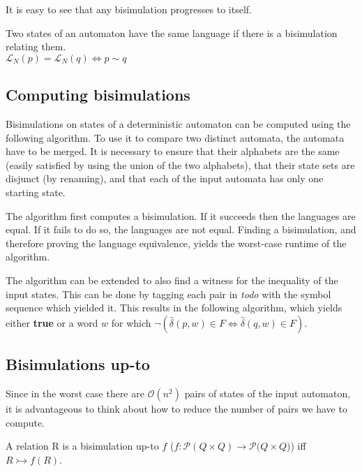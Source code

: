 It is easy to see that any bisimulation progresses to itself.

\begin{definition}
  Two states of an automaton have the same language if there is a bisimulation relating them. \\
  $\mathcal{L}_N(p) = \mathcal{L}_N(q) \iff p \sim q$
\end{definition}

\subsection{Computing bisimulations}

Bisimulations on states of a deterministic automaton can be computed using the following algorithm.
To use it to compare two distinct automata, the automata have to be merged.
It is necessary to ensure that their alphabets are the same (easily satisfied by
using the union of the two alphabets), that their state sets are disjunct
(by renaming), and that each of the input automata has only one starting state.



The algorithm first computes a bisimulation. If it succeeds then the languages are
equal. If it fails to do so, the languages are not equal.
Finding a bisimulation, and therefore proving the language equivalence, yields
the worst-case runtime of the algorithm.

The algorithm can be extended to also find a witness for the inequality of the
input states. This can be done by tagging each pair in \textit{todo} with the
symbol sequence which yielded it. This results in the following algorithm,
which yields either \textbf{true} or a word $w$ for which
$\neg (\hat{\delta}(p, w) \in F \iff \hat{\delta}(q, w) \in F)$.



\subsection{Bisimulations up-to}

Since in the worst case there are $\mathcal{O}(n^2)$ pairs of states of the
input automaton, it is advantageous to think about how to reduce the number of
pairs we have to compute.

\begin{definition}
A relation R is a bisimulation up-to $f$
($f : \mathcal{P}(Q \times Q) \to \mathcal{P}(Q \times Q$)) iff $R \rightarrowtail f(R)$.
\end{definition}

